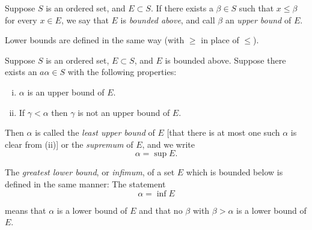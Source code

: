 \begin{myDef}\label{myDef:1.7}
Suppose $S$ is an ordered set, and $E \subset S$. If there exists a
$\beta \in S$ such that $x \leq \beta$ for every $x \in E$, we say that $E$ is \emph{bounded above}, and call
$\beta$ an \emph{upper bound} of $E$.

Lower bounds are defined in the same way (with $\geq$ in place of $\leq$).
\end{myDef}

\begin{myDef}\label{myDef:1.8}
Suppose $S$ is an ordered set, $E \subset S$, and $E$ is bounded above.
Suppose there exists an $a\alpha \in S$ with the following properties:

\begin{enumerate}[(i)]
    \item $\alpha$ is an upper bound of $E$.
    \item If $\gamma <\alpha$ then $\gamma$ is not an upper bound of $E$.
\end{enumerate}

Then $\alpha$ is called the \emph{least upper bound} of $E$ [that there is at most one such
$\alpha$ is clear from (ii)] or the \emph{supremum} of $E$, and we write
\begin{equation*}
    \alpha = \sup E.
\end{equation*}

The \emph{greatest lower bound}, or \emph{infimum}, of a set $E$ which is bounded below
is defined in the same manner: The statement
\begin{equation*}
    \alpha = \inf E
\end{equation*}

means that $\alpha$ is a lower bound of $E$ and that no $\beta$ with $\beta > \alpha$ is a lower bound
of $E$.
\end{myDef}

